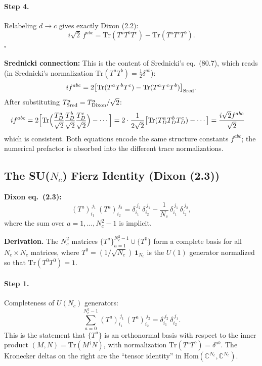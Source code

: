 \paragraph{Step 4.} Relabeling $d\to c$ gives exactly Dixon (2.2):
\begin{equation}
  \boxed{i\sqrt{2}\,f^{abc}
  = \mathrm{Tr}(T^a T^b T^c) - \mathrm{Tr}(T^a T^c T^b).}
\end{equation}
$\square$

\textbf{Srednicki connection:} This is the content of Srednicki's eq.~(80.7), which reads
(in Srednicki's normalization $\mathrm{Tr}(T^aT^b)=\tfrac{1}{2}\delta^{ab}$):
\begin{equation}
  i f^{abc} = 2\bigl[\mathrm{Tr}(T^a T^b T^c) - \mathrm{Tr}(T^a T^c T^b)\bigr]_{\rm Sred}.
\end{equation}
After substituting $T^a_{\rm Sred}=T^a_{\rm Dixon}/\sqrt{2}$:
\begin{align}
  i f^{abc}
  &= 2\Bigl[\mathrm{Tr}\Bigl(\frac{T^a_D}{\sqrt{2}}\frac{T^b_D}{\sqrt{2}}\frac{T^c_D}{\sqrt{2}}\Bigr)
   - \cdots\Bigr]
   = 2\cdot\frac{1}{2\sqrt{2}}\bigl[\mathrm{Tr}(T^a_D T^b_D T^c_D)-\cdots\bigr]
   = \frac{i\sqrt{2}f^{abc}}{\sqrt{2}}
\end{align}
which is consistent. Both equations encode the same structure constants $f^{abc}$;
the numerical prefactor is absorbed into the different trace normalizations.

\subsection{The SU($N_c$) Fierz Identity (Dixon (2.3))}
\label{sec:fierz-color}

\textbf{Dixon eq.~(2.3):}
\begin{equation}\label{eq:dixon2.3}
  (T^a)_{i_1}^{\ j_1}\,(T^a)_{i_2}^{\ j_2}
  = \delta_{i_1}^{\ j_2}\,\delta_{i_2}^{\ j_1}
  - \frac{1}{N_c}\,\delta_{i_1}^{\ j_1}\,\delta_{i_2}^{\ j_2},
\end{equation}
where the sum over $a=1,\ldots,N_c^2-1$ is implicit.

\textbf{Derivation.}
The $N_c^2$ matrices $\{T^a\}_{a=1}^{N_c^2-1}\cup\{T^0\}$ form a complete basis for
all $N_c\times N_c$ matrices, where $T^0=(1/\sqrt{N_c})\,\mathbf{1}_{N_c}$ is the
$U(1)$ generator normalized so that $\mathrm{Tr}(T^0 T^0)=1$.

\paragraph{Step 1.} Completeness of $U(N_c)$ generators:
\begin{equation}\label{eq:UN-complete}
  \sum_{a=0}^{N_c^2-1}(T^a)_{i_1}^{\ j_1}\,(T^a)_{i_2}^{\ j_2}
  = \delta_{i_1}^{\ j_2}\,\delta_{i_2}^{\ j_1}.
\end{equation}
This is the statement that $\{T^a\}$ is an orthonormal basis with respect to the
inner product $(M,N)=\mathrm{Tr}(M^\dagger N)$, with normalization $\mathrm{Tr}(T^aT^b)=\delta^{ab}$.
The Kronecker deltas on the right are the ``tensor identity'' in
$\mathrm{Hom}(\mathbb{C}^{N_c},\mathbb{C}^{N_c})$.


